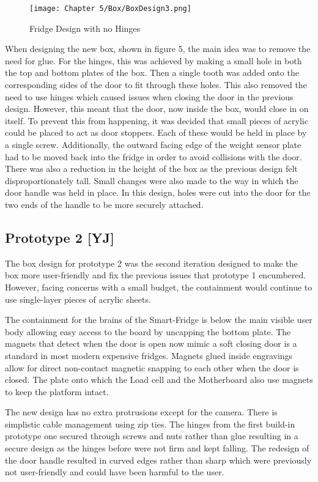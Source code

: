 \begin{figure}[H]        
    \centering
    \texttt{[image: Chapter 5/Box/BoxDesign3.png]}
    \caption{Fridge Design with no Hinges}
    \label{fig:designnohinges}
\end{figure} 

When designing the new box, shown in figure 5, the main idea was to remove the need for glue.
For the hinges, this was achieved by making a small hole in both the top and bottom plates of the box.
Then a single tooth was added onto the corresponding sides of the door to fit through these holes.
This also removed the need to use hinges which caused issues when closing the door in the previous design.
However, this meant that the door, now inside the box, would close in on itself.
To prevent this from happening, it was decided that small pieces of acrylic could be placed to act as door stoppers.
Each of these would be held in place by a single screw.
Additionally, the outward facing edge of the weight sensor plate had to be moved back into the fridge in order to avoid collisions with the door.
There was also a reduction in the height of the box as the previous design felt disproportionately tall.
Small changes were also made to the way in which the door handle was held in place.
In this design, holes were cut into the door for the two ends of the handle to be more securely attached.

\subsection{Prototype 2 [YJ]}

The box design for prototype 2 was the second iteration designed to make the box more user-friendly and fix the previous issues that prototype 1 encumbered.
However, facing concerns with a small budget, the containment would continue to use single-layer pieces of acrylic sheets.

The containment for the brains of the Smart-Fridge is below the main visible user body allowing easy access to the board by uncapping the bottom plate.
The magnets that detect when the door is open now mimic a soft closing door is a standard in most modern expensive fridges.
Magnets glued inside engravings allow for direct non-contact magnetic snapping to each other when the door is closed.
The plate onto which the Load cell and the Motherboard also use magnets to keep the platform intact.

The new design has no extra protrusions except for the camera.
There is simplistic cable management using zip ties.
The hinges from the first build-in prototype one secured through screws and nuts rather than glue resulting in a secure design as the hinges before were not firm and kept falling.
The redesign of the door handle resulted in curved edges rather than sharp which were previously not user-friendly and could have been harmful to the user.